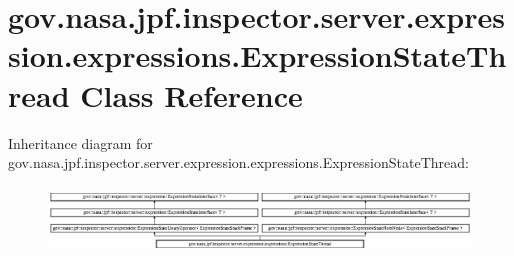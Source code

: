 \hypertarget{classgov_1_1nasa_1_1jpf_1_1inspector_1_1server_1_1expression_1_1expressions_1_1_expression_state_thread}{}\section{gov.\+nasa.\+jpf.\+inspector.\+server.\+expression.\+expressions.\+Expression\+State\+Thread Class Reference}
\label{classgov_1_1nasa_1_1jpf_1_1inspector_1_1server_1_1expression_1_1expressions_1_1_expression_state_thread}
Inheritance diagram for gov.\+nasa.\+jpf.\+inspector.\+server.\+expression.\+expressions.\+Expression\+State\+Thread\+:\begin{figure}[H]
\begin{center}
\leavevmode
\includegraphics[height=1.794872cm]{classgov_1_1nasa_1_1jpf_1_1inspector_1_1server_1_1expression_1_1expressions_1_1_expression_state_thread}
\end{center}
\end{figure}
